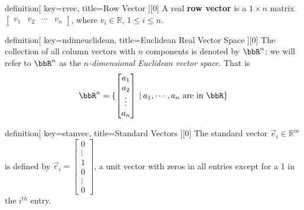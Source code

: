 \begin{SaveConcept}{definition}[
		key=rvec,
		title={Row Vector}
	][0]
	A real \textbf{row vector} is a $ 1\times n$ matrix $\begin{bmatrix} v_1&v_2&\cdots&v_n \end{bmatrix}$, where $ v_i\in \mathbb R$, $1\leq i\leq n$. 
\end{SaveConcept}


\begin{SaveConcept}{definition}[
		key=ndimeuclidean,
		title={Euclidean Real Vector Space}
	][0]
        The collection of all column vectors with $n$ components is denoted by $\bbR^n$; we will refer to $\bbR^n$ as the \textit{$n$-dimensional Euclidean vector space}. That is
        $$
        \bbR^n=\{\begin{bmatrix}
	a_1\\a_2\\\vdots\\a_n
        \end{bmatrix}\:|\: a_1,\cdots,a_n \text{ are in } \bbR\}
        $$
\end{SaveConcept}


\begin{SaveConcept}{definition}[
		key=stanvec,
		title={Standard Vectors}
	][0]
        The standard vector $\vec{e}_i\in\mathbb{R}^m$ is defined by $\vec{e}_i=\begin{bmatrix} 0\\\vdots\\ 1\\ 0 \\ \vdots\\0 \end{bmatrix}$, a unit vector with zeros in all entries except for a 1 in the $i^{th}$ entry.
\end{SaveConcept}



